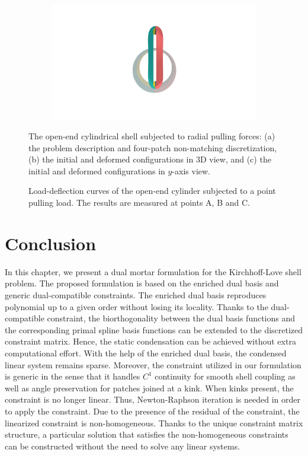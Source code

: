 \begin{figure}[h]
\begin{subfigure}[b]{.45\textwidth}
		\centering
		\includegraphics[scale=.3,trim={22cm 8cm 22cm 3cm},clip]{cylindrical_deformed_2}
		\caption{}
	\end{subfigure}
	\caption{The open-end cylindrical shell subjected to radial pulling forces: (a) the problem description and four-patch non-matching discretization, (b) the initial and deformed configurations in 3D view, and (c) the initial and deformed configurations in $y$-axis view.}
\end{figure}
\newpage 
\vfill
\begin{figure}
	\center
	\centering
	\begin{center}
		
	\end{center}
	\caption{Load-deflection curves of the open-end cylinder subjected to a point pulling load. The results are measured at points A, B and C.}
	\label{fig:cylindrical_pull_result}
\end{figure}
\vfill
\clearpage
\section{Conclusion}\label{sec:conlusion}
In this chapter, we present a dual mortar formulation for the Kirchhoff-Love shell problem. The proposed formulation is based on the enriched \Bezier dual basis and generic dual-compatible constraints. The enriched \Bezier dual basis reproduces polynomial up to a given order without losing its locality. Thanks to the dual-compatible constraint, the biorthogonality between the dual basis functions and the corresponding primal spline basis functions can be extended to the discretized constraint matrix. Hence, the static condensation can be achieved without extra computational effort. With the help of the enriched \Bezier dual basis, the condensed linear system remains sparse. Moreover, the constraint utilized in our formulation is generic in the sense that it handles $C^1$ continuity for smooth shell coupling as well as angle preservation for patches joined at a kink. When kinks present, the constraint is no longer linear. Thus, Newton-Raphson iteration is needed in order to apply the constraint. Due to the presence of the residual of the constraint, the linearized constraint is non-homogeneous. Thanks to the unique constraint matrix structure, a particular solution that satisfies the non-homogeneous constraints can be constructed without the need to solve any linear systems. \par

